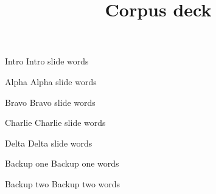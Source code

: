 \documentclass{beamer}
\title{Corpus deck}
\begin{document}
\begin{frame}{Intro}
  Intro slide words
\end{frame}
\begin{frame}{Alpha}
  Alpha slide words
\end{frame}
\begin{frame}{Bravo}
  Bravo slide words
\end{frame}
\begin{frame}{Charlie}
  Charlie slide words
\end{frame}
\begin{frame}{Delta}
  Delta slide words
\end{frame}
\appendix
\begin{frame}{Backup one}
  Backup one words
\end{frame}
\begin{frame}{Backup two}
  Backup two words
\end{frame}
\end{document}
